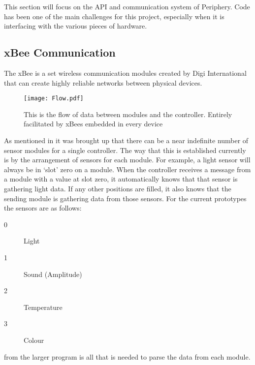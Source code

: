 
This section will focus on the API and communication system of Periphery. Code has been one of the main challenges for this project, especially when it is interfacing with the various pieces of hardware.

\subsection{xBee Communication}\label{subsec:xbee-comms}

The xBee is a set wireless communication modules created by Digi International that can create highly reliable networks between physical devices.

\begin{figure}
  \texttt{[image: Flow.pdf]}
  \caption{This is the flow of data between modules and the controller. Entirely facilitated by xBees embedded in every device}
  \label{fig:xbeecomms}
\end{figure}

As mentioned in  it was brought up that there can be a near indefinite number of sensor modules for a single controller. The way that this is established currently is by the arrangement of sensors for each module. For example, a light sensor will always be in `slot' zero on a module. When the controller receives a message from a module with a value at slot zero, it automatically knows that that sensor is gathering light data. If any other positions are filled, it also knows that the sending module is gathering data from those sensors. For the current prototypes the sensors are as follows: 

\begin{description}
  \item[0] Light
  \item[1] Sound (Amplitude)
  \item[2] Temperature
  \item[3] Colour
\end{description}

 from the larger program is all that is needed to parse the data from each module.

